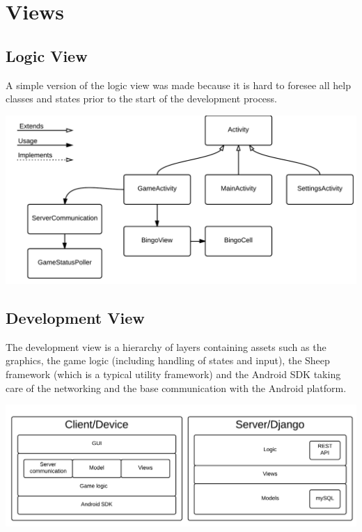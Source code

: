 \section{Views}
\label{sec:views}

\subsection{Logic View}
A simple version of the logic view was made because it is hard to foresee all
help classes and states prior to the start of the development process.
\begin{center}
\includegraphics[clip=true, width=0.9 \textwidth]{Pikks/LogicViewFinal.png}
\label{ref:gantt}
\end{center}

\subsection{Development View}
The development view is a hierarchy of layers containing assets such as the
graphics, the game logic (including handling of states and input), the Sheep
framework (which is a typical utility framework) and the Android SDK taking care
of the networking and the base communication with the Android platform.
\begin{center}
\includegraphics[clip=true, width=0.9 \textwidth]{Pikks/DevelopmentViewFinal.png}
\label{ref:gantt}
\end{center}

